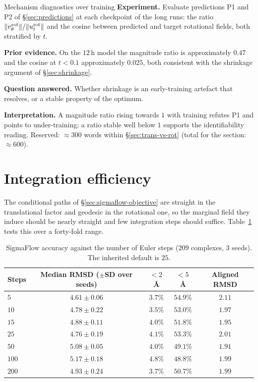 \begin{reserved}{Mechanism diagnostics over training}
\textbf{Experiment.} Evaluate predictions P1 and P2 of \S\ref{sec:predictions}
at each checkpoint of the long runs: the ratio
$\|v_\theta^{\mathrm{rot}}\|/\|u_t^{\mathrm{rot}}\|$ and the cosine between
predicted and target rotational fields, both stratified by $t$.

\textbf{Prior evidence.} On the $12$\,h model the magnitude ratio is
approximately $0.47$ and the cosine at $t<0.1$ approximately $0.025$, both
consistent with the shrinkage argument of \S\ref{sec:shrinkage}.

\textbf{Question answered.} Whether shrinkage is an early-training artefact
that resolves, or a stable property of the optimum.

\textbf{Interpretation.} A magnitude ratio rising towards $1$ with training
refutes P1 and points to under-training; a ratio stable well below $1$
supports the identifiability reading. Reserved: \(\approx 300\) words within
\S\ref{sec:trans-vs-rot} (total for the section: \(\approx 600\)).
\end{reserved}

\section{Integration efficiency}
\label{sec:nfe}

The conditional paths of \S\ref{sec:sigmaflow-objective} are straight in the
translational factor and geodesic in the rotational one, so the marginal field
they induce should be nearly straight and few integration steps should
suffice. Table~\ref{tab:nfe} tests this over a forty-fold range.

\begin{table}[htbp]
\centering
\caption{SigmaFlow accuracy against the number of Euler steps
($209$ complexes, $3$ seeds). The inherited default is $25$.}
\label{tab:nfe}
\small
\begin{tabular}{@{}lcccc@{}}
\toprule
Steps & Median RMSD ($\pm$SD over seeds) & $<2$\,\AA & $<5$\,\AA & Aligned RMSD \\
\midrule
$5$   & $4.61 \pm 0.06$ & $3.7\%$ & $54.9\%$ & $2.11$ \\
$10$  & $4.78 \pm 0.22$ & $3.5\%$ & $53.0\%$ & $1.97$ \\
$15$  & $4.88 \pm 0.11$ & $4.0\%$ & $51.8\%$ & $1.95$ \\
$25$  & $4.76 \pm 0.19$ & $4.1\%$ & $53.3\%$ & $2.01$ \\
$50$  & $5.08 \pm 0.05$ & $4.0\%$ & $49.1\%$ & $1.91$ \\
$100$ & $5.17 \pm 0.18$ & $4.8\%$ & $48.8\%$ & $1.99$ \\
$200$ & $4.93 \pm 0.24$ & $3.7\%$ & $50.7\%$ & $1.99$ \\
\bottomrule
\end{tabular}
\end{table}

